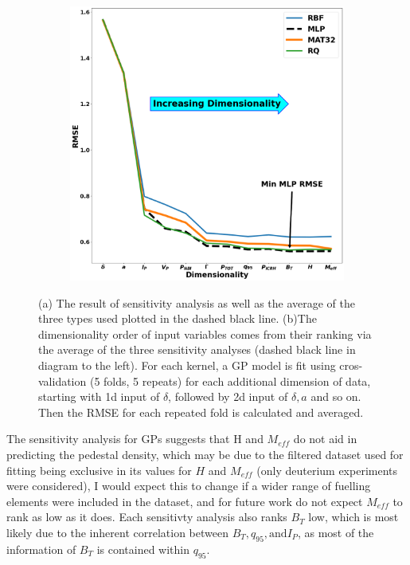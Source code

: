 \documentclass[a4paper, twoside, final, 12pt]{article}
\begin{document}
{\begin{figure}
	\begin{subfigure}{0.48\linewidth}
		\centering
		\includegraphics[scale=0.2]{ ./src/final_GP_dim_v2}
		\caption{}
		\label{subfig:GP_vs_dimensionality}
	\end{subfigure}
	\caption{(a) The result of sensitivity analysis as well as the average of the three types used plotted in the dashed black line. (b)The dimensionality order of input variables comes from their ranking via the average of the three sensitivity analyses (dashed black line in diagram to the left). For each kernel, a GP model is fit using cros-validation (5 folds, 5 repeats) for each additional dimension of data, starting with 1d input of $\delta$, followed by 2d input of $\delta, a$ and so on. Then the RMSE for each repeated fold is calculated and averaged.  }
\end{figure}
The sensitivity analysis for GPs suggests that H and $M_{eff}$ do not aid in predicting the pedestal density, which may be due to the filtered dataset used for fitting being exclusive in its values for $H$ and $M_{eff}$ (only deuterium experiments were considered), 
I would expect this to change if a wider range of fuelling elements were included in the dataset, and for future work do not expect $M_{eff}$ to rank as low as it does. Each sensitivty analysis also ranks $B_T$ low, which is most likely due to the inherent correlation between $B_T, q_{95}, \text{and} I_P$, as most of the information of $B_T$ is contained within $q_{95}$. 

}
\end{document}
